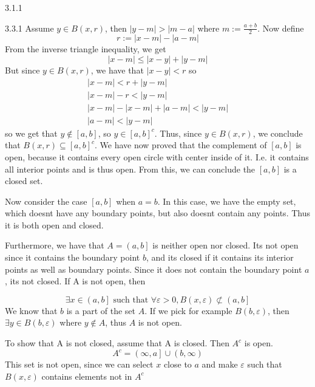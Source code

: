 \documentclass[a4paper,norsk]{article}
\renewcommand{\leq}{\leqslant}
\renewcommand{\epsilon}{\varepsilon}
\begin{document}
\begin{oppgavebox}{3.1.1}{}
\begin{proofbox}{3.3.1}{}
  Assume $ y \in  B \left( x, r \right)  $, then $ \left| y - m \right| > \left| m - a \right|   $ where $ m := \frac{ a+b }{ 2 } $. Now define
  \[
      r := \left| x - m \right| - \left| a - m \right|  
  \]
  From the inverse triangle inequality, we get
  \[
      \left| x - m \right| \leq \left| x - y \right| + \left| y - m \right| 
  \]
  But since $ y \in B \left( x, r \right)  $, we have that $ \left| x - y  \right| < r  $ so 
  \begin{align*}
    \left| x - m \right| < r + \left| y - m \right| \\
    \left| x - m \right| - r < \left| y - m \right| \\
    \left| x - m \right| - \left| x - m \right| + \left| a-m \right| < \left| y - m \right| \\
    \left| a - m \right| < \left| y - m \right| 
  \end{align*}
  so we get that $ y \notin \left[ a,b \right]  $, so $ y \in \left[ a, b \right] ^c $. Thus, since $ y \in B \left( x, r \right)  $, we conclude that $ B \left( x, r \right) \subseteq \left[ a, b \right] ^c $. We have now proved that the complement of $ \left[ a, b \right]  $ is open, because it contains every open circle with center inside of it. I.e. it contains all interior points and is thus open. From this, we can conclude the $ \left[ a, b \right]  $ is a closed set.



  Now consider the case $ \left[ a, b \right]  $ when $ a=b $. In this case, we have the empty set, which doesnt have any boundary points, but also doesnt contain any points. Thus it is both open and closed.


  Furthermore, we have that $A = \left( a, b \right] $ is neither open nor closed. Its not open since it contains the boundary point $ b $, and its closed if it contains its interior points as well as boundary points. Since it does not contain the boundary point $ a $, its not closed. If A is not open, then

  \[
      \exists x \in \left(a, b\right] \text{ such that } \forall \epsilon > 0, B(x, \epsilon ) \not \subset \left(a, b\right]
  \]
  We know that $ b $ is a part of the set $ A $. If we pick for example $ B \left( b, \epsilon  \right) $, then $ \exists y \in B (b, \epsilon ) $  where $ y \notin A $, thus $ A $  is not open.


  To show that A is not closed, assume that A is closed. Then $ A^c $ is open. 
  \[
      A^c = \left( \infty, a \right] \cup \left( b, \infty \right) 
  \]
  This set is not open, since we can select $ x $ close to $ a $ and make $ \epsilon  $ such that $ B(x, \epsilon ) $ contains elements not in $ A^c $  
  
\end{proofbox}
\end{oppgavebox}
\end{document}
